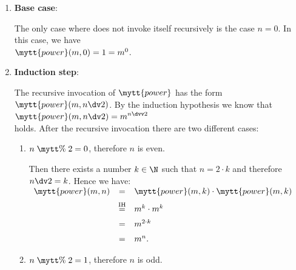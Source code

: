 \begin{enumerate}
\item \textbf{Base case}:

      The only case where  does not invoke itself recursively is the case $n = 0$.  
      In this case, we have
      \\[0.2cm]
      \hspace*{1.3cm} 
      $\mytt{power}(m,0) = 1 =  m^0$. \mycheck
\item \textbf{Induction step}:

      The recursive invocation of $\mytt{power}$ has the form
      $\mytt{power}(m,n \dv 2)$.  By the induction hypothesis we know that 
      \\[0.2cm]
      \hspace*{1.3cm}
      $\displaystyle \mytt{power}(m,n \dv 2) = m^{n \dvv 2}$ 
      \\[0.2cm]
      holds.  After the recursive invocation there are two different cases:
      \begin{enumerate}
      \item $n \;\mytt{\%}\; 2 = 0$, therefore $n$ is even.

            Then there exists a number $k \in \N$ such that $n = 2 \cdot k$ and therefore
            $n \dv 2 = k$.
            Hence we have:
            \\[0.2cm]
            \hspace*{1.3cm}
           $ 
            \begin{array}{lcl}
            \mytt{power}(m,n) & = & \mytt{power}(m,k) \cdot \mytt{power}(m,k) \\[0.2cm]
                                & \stackrel{\mathrm{IH}}{=} & m^k \cdot m^k  \\[0.2cm]
                                & = & m^{2\cdot k} \\[0.2cm]
                                & = & m^{n}.
            \end{array}
            $            
      \item $n \;\mytt{\%}\; 2 = 1$, therefore $n$ is odd.


\end{enumerate}
\end{enumerate}
